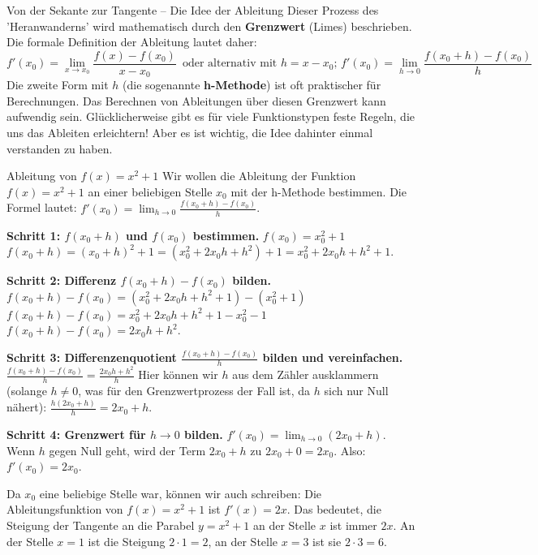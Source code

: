 \begin{infoboxumgebung}{Von der Sekante zur Tangente – Die Idee der Ableitung}
Dieser Prozess des 'Heranwanderns' wird mathematisch durch den \textbf{Grenzwert} (Limes) beschrieben. Die formale Definition der Ableitung lautet daher:
\[ f'(x_0) = \lim_{x \to x_0} \frac{f(x) - f(x_0)}{x - x_0}\, \text{ oder alternativ mit } h = x-x_0;  \, f'(x_0) = \lim_{h \to 0} \frac{f(x_0+h) - f(x_0)}{h} \]
Die zweite Form mit $h$ (die sogenannte \textbf{h-Methode}) ist oft praktischer für Berechnungen. Das Berechnen von Ableitungen über diesen Grenzwert kann aufwendig sein. Glücklicherweise gibt es für viele Funktionstypen feste Regeln, die uns das Ableiten erleichtern! Aber es ist wichtig, die Idee dahinter einmal verstanden zu haben.
\end{infoboxumgebung}

\begin{beispielumgebung}{Ableitung von $f(x) = x^2 + 1$}
Wir wollen die Ableitung der Funktion $f(x) = x^2 + 1$ an einer beliebigen Stelle $x_0$ mit der h-Methode bestimmen.
Die Formel lautet: $f'(x_0) = \lim_{h \to 0} \frac{f(x_0+h) - f(x_0)}{h}$.

\textbf{Schritt 1: $f(x_0+h)$ und $f(x_0)$ bestimmen.}
$f(x_0) = x_0^2 + 1$
$f(x_0+h) = (x_0+h)^2 + 1 = (x_0^2 + 2x_0h + h^2) + 1 = x_0^2 + 2x_0h + h^2 + 1$.

\textbf{Schritt 2: Differenz $f(x_0+h) - f(x_0)$ bilden.}
$f(x_0+h) - f(x_0) = (x_0^2 + 2x_0h + h^2 + 1) - (x_0^2 + 1)$
$f(x_0+h) - f(x_0) = x_0^2 + 2x_0h + h^2 + 1 - x_0^2 - 1$
$f(x_0+h) - f(x_0) = 2x_0h + h^2$.

\textbf{Schritt 3: Differenzenquotient $\frac{f(x_0+h) - f(x_0)}{h}$ bilden und vereinfachen.}
$\frac{f(x_0+h) - f(x_0)}{h} = \frac{2x_0h + h^2}{h}$
Hier können wir $h$ aus dem Zähler ausklammern (solange $h \neq 0$, was für den Grenzwertprozess der Fall ist, da $h$ sich nur Null nähert):
$\frac{h(2x_0 + h)}{h} = 2x_0 + h$.

\textbf{Schritt 4: Grenzwert für $h \to 0$ bilden.}
$f'(x_0) = \lim_{h \to 0} (2x_0 + h)$.
Wenn $h$ gegen Null geht, wird der Term $2x_0+h$ zu $2x_0+0 = 2x_0$.
Also: $f'(x_0) = 2x_0$.

Da $x_0$ eine beliebige Stelle war, können wir auch schreiben: Die Ableitungsfunktion von $f(x)=x^2+1$ ist $f'(x)=2x$.
Das bedeutet, die Steigung der Tangente an die Parabel $y=x^2+1$ an der Stelle $x$ ist immer $2x$. An der Stelle $x=1$ ist die Steigung $2 \cdot 1 = 2$, an der Stelle $x=3$ ist sie $2 \cdot 3 = 6$.
\end{beispielumgebung}

